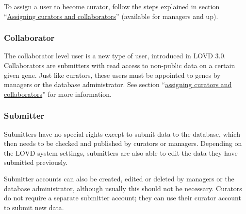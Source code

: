 To assign a user to become curator, follow the steps explained in section
 ``\hyperlink{sec:gene_assign_curators}{Assigning curators and collaborators}'' (available for managers and up).

\subsubsection{Collaborator}
The collaborator level user is a new type of user, introduced in LOVD 3.0.
Collaborators are submitters with read access to non-public data on a certain given gene.
Just like curators, these users must be appointed to genes by managers or the database administrator.
See section ``\hyperlink{sec:gene_assign_curators}{assigning curators and collaborators}'' for more information.

\subsubsection{Submitter}
Submitters have no special rights except to submit data to the database, which then needs to be checked and published by curators or managers.
Depending on the LOVD system settings, submitters are also able to edit the data they have submitted previously.

Submitter accounts can also be created, edited or deleted by managers or the database administrator, although usually this should not be necessary.
Curators do not require a separate submitter account; they can use their curator account to submit new data.














